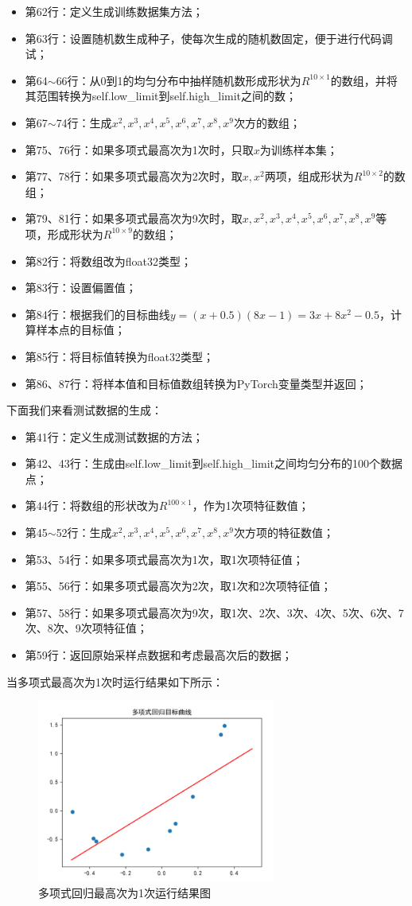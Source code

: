 \documentclass[UTF8]{article}
\begin{document}
\begin{itemize}
\item 第62行：定义生成训练数据集方法；
\item 第63行：设置随机数生成种子，使每次生成的随机数固定，便于进行代码调试；
\item 第64$\sim$66行：从0到1的均匀分布中抽样随机数形成形状为$R^{10 \times 1}$的数组，并将其范围转换为self.low\_limit到self.high\_limit之间的数；
\item 第67$\sim$74行：生成$x^{2}, x^{3}, x^{4}, x^{5}, x^{6}, x^{7}, x^{8}, x^{9}$次方的数组；
\item 第75、76行：如果多项式最高次为1次时，只取$x$为训练样本集；
\item 第77、78行：如果多项式最高次为2次时，取$x, x^{2}$两项，组成形状为$R^{10 \times 2}$的数组；
\item 第79、81行：如果多项式最高次为9次时，取$x, x^{2}, x^{3}, x^{4}, x^{5}, x^{6}, x^{7}, x^{8}, x^{9}$等项，形成形状为$R^{10 \times 9}$的数组；
\item 第82行：将数组改为float32类型；
\item 第83行：设置偏置值；
\item 第84行：根据我们的目标曲线$y=(x+0.5)(8x-1)=3x+8x^{2}-0.5$，计算样本点的目标值；
\item 第85行：将目标值转换为float32类型；
\item 第86、87行：将样本值和目标值数组转换为PyTorch变量类型并返回；
\end{itemize}
下面我们来看测试数据的生成：
\begin{itemize}
\item 第41行：定义生成测试数据的方法；
\item 第42、43行：生成由self.low\_limit到self.high\_limit之间均匀分布的100个数据点；
\item 第44行：将数组的形状改为$R^{100 \times 1}$，作为1次项特征数值；
\item 第45$\sim$52行：生成$x^{2}, x^{3}, x^{4}, x^{5}, x^{6}, x^{7}, x^{8}, x^{9}$次方项的特征数值；
\item 第53、54行：如果多项式最高次为1次，取1次项特征值；
\item 第55、56行：如果多项式最高次为2次，取1次和2次项特征值；
\item 第57、58行：如果多项式最高次为9次，取1次、2次、3次、4次、5次、6次、7次、8次、9次项特征值；
\item 第59行：返回原始采样点数据和考虑最高次后的数据；
\end{itemize}
当多项式最高次为1次时运行结果如下所示：
\begin{figure}[H]
	\caption{多项式回归最高次为1次运行结果图}
	\label{f000017}
	\centering
	\includegraphics[height=6cm]{images/f000017}
\end{figure}
\end{document}
